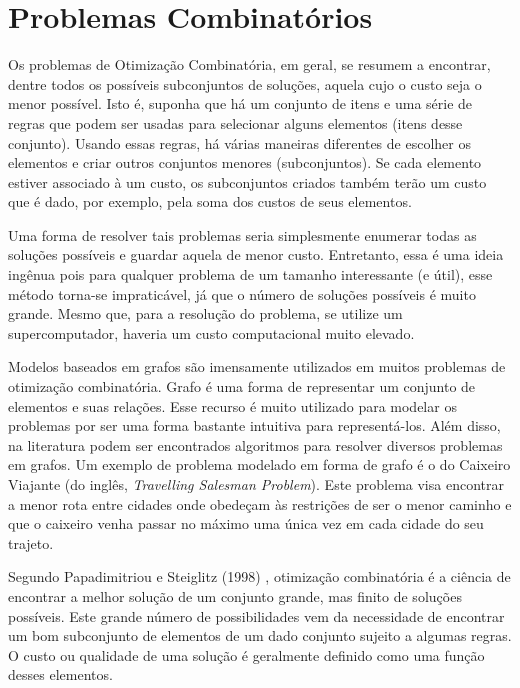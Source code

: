 \chapter{Problemas Combinatórios}



Os problemas de Otimização Combinatória, em geral, se resumem a encontrar, dentre todos os possíveis subconjuntos de soluções, aquela cujo o custo seja o menor possível. Isto é, suponha que há um conjunto de itens e uma série de regras que podem ser usadas para selecionar alguns elementos (itens desse conjunto). Usando essas regras, há várias maneiras diferentes de escolher os elementos e criar outros conjuntos menores (subconjuntos). Se cada elemento estiver associado à um custo, os subconjuntos criados também terão um custo que é dado, por exemplo, pela soma dos custos de seus elementos.

Uma forma de resolver tais problemas seria simplesmente enumerar todas as soluções possíveis e guardar aquela de menor custo. Entretanto, essa é uma ideia ingênua pois para qualquer problema de um tamanho interessante (e útil), esse método torna-se impraticável, já que o número de soluções possíveis é muito grande. Mesmo que, para a resolução do problema, se utilize um supercomputador, haveria um custo computacional muito elevado.

Modelos baseados em grafos são imensamente utilizados em muitos problemas de otimização combinatória. Grafo é uma forma de representar um conjunto de elementos e suas relações. Esse recurso é muito utilizado para modelar os problemas por ser uma forma bastante intuitiva para representá-los. Além disso, na literatura podem ser encontrados algoritmos para resolver diversos problemas em grafos. Um exemplo de problema modelado em forma de grafo é o do Caixeiro Viajante (do inglês, \textit{Travelling Salesman Problem}). Este problema visa encontrar a menor rota entre cidades onde obedeçam às restrições de ser o menor caminho e que o caixeiro venha passar no máximo uma única vez em cada cidade do seu trajeto.

Segundo Papadimitriou e Steiglitz (1998) \cite{papadimitriou1982combinatorial}, otimização combinatória é a ciência de encontrar a melhor solução de um conjunto grande, mas finito de soluções possíveis. Este grande número de possibilidades vem da necessidade de encontrar um bom subconjunto de elementos de um dado conjunto sujeito a algumas regras. O custo ou qualidade de uma solução é geralmente definido como uma função desses elementos.

